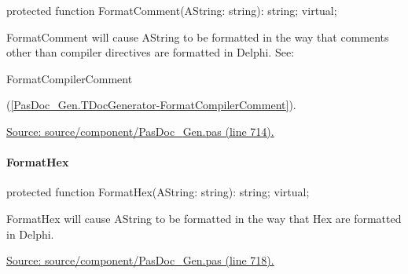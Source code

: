 \documentclass{report}
\newif\ifpdf
\begin{document}
\label{PasDoc_Gen.TDocGenerator-FormatComment}
\begin{list}{}{
\setlength{\itemindent}{0cm}
\setlength{\listparindent}{0cm}
\setlength{\leftmargin}{\evensidemargin}
\addtolength{\leftmargin}{\tmplength}
\settowidth{\labelsep}{X}
\addtolength{\leftmargin}{\labelsep}
\setlength{\labelwidth}{\tmplength}
}
\item[\textbf{Declaration}\hfill]
\ifpdf
\begin{flushleft}
\fi
\begin{ttfamily}
protected function FormatComment(AString: string): string; virtual;\end{ttfamily}

\ifpdf
\end{flushleft}
\fi

\par
\item[\textbf{Description}]
FormatComment will cause AString to be formatted in the way that comments other than compiler directives are formatted in Delphi. See: \begin{ttfamily}FormatCompilerComment\end{ttfamily}(\ref{PasDoc_Gen.TDocGenerator-FormatCompilerComment}).\par
\href{https://github.com/pasdoc/pasdoc/blob/master/source/component/PasDoc_Gen.pas#L714}{Source: source/component/PasDoc{\_}Gen.pas (line 714).}

\end{list}
\paragraph*{FormatHex}\hspace*{\fill}

\label{PasDoc_Gen.TDocGenerator-FormatHex}
\begin{list}{}{
\setlength{\itemindent}{0cm}
\setlength{\listparindent}{0cm}
\setlength{\leftmargin}{\evensidemargin}
\addtolength{\leftmargin}{\tmplength}
\settowidth{\labelsep}{X}
\addtolength{\leftmargin}{\labelsep}
\setlength{\labelwidth}{\tmplength}
}
\item[\textbf{Declaration}\hfill]
\ifpdf
\begin{flushleft}
\fi
\begin{ttfamily}
protected function FormatHex(AString: string): string; virtual;\end{ttfamily}

\ifpdf
\end{flushleft}
\fi

\par
\item[\textbf{Description}]
FormatHex will cause AString to be formatted in the way that Hex are formatted in Delphi.\par
\href{https://github.com/pasdoc/pasdoc/blob/master/source/component/PasDoc_Gen.pas#L718}{Source: source/component/PasDoc{\_}Gen.pas (line 718).}

\end{list}
\end{document}
